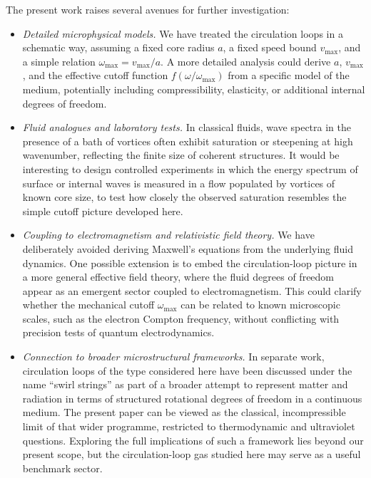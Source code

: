 \documentclass[11pt]{article}
\begin{document}
            The present work raises several avenues for further investigation:

            \begin{itemize}
                \item \emph{Detailed microphysical models.}
                We have treated the circulation loops in a schematic way, assuming a fixed
                core radius $a$, a fixed speed bound $v_{\max}$, and a simple relation
                $\omega_{\max} = v_{\max}/a$. A more detailed analysis could derive $a$,
                $v_{\max}$, and the effective cutoff function $f(\omega/\omega_{\max})$
                from a specific model of the medium, potentially including compressibility,
                elasticity, or additional internal degrees of freedom.

                \item \emph{Fluid analogues and laboratory tests.}
                In classical fluids, wave spectra in the presence of a bath of vortices often
                exhibit saturation or steepening at high wavenumber, reflecting the finite
                size of coherent structures. It would be interesting to design controlled
                experiments in which the energy spectrum of surface or internal waves is
                measured in a flow populated by vortices of known core size, to test how
                closely the observed saturation resembles the simple cutoff picture developed
                here.

                \item \emph{Coupling to electromagnetism and relativistic field theory.}
                We have deliberately avoided deriving Maxwell's equations from the underlying
                fluid dynamics. One possible extension is to embed the circulation-loop
                picture in a more general effective field theory, where the fluid degrees of
                freedom appear as an emergent sector coupled to electromagnetism. This could
                clarify whether the mechanical cutoff $\omega_{\max}$ can be related to
                known microscopic scales, such as the electron Compton frequency, without
                conflicting with precision tests of quantum electrodynamics.

                \item \emph{Connection to broader microstructural frameworks.}
                In separate work, circulation loops of the type considered here have been
                discussed under the name ``swirl strings'' as part of a broader attempt to
                represent matter and radiation in terms of structured rotational degrees of
                freedom in a continuous medium. The present paper can be viewed as the
                classical, incompressible limit of that wider programme, restricted to
                thermodynamic and ultraviolet questions. Exploring the full implications of
                such a framework lies beyond our present scope, but the circulation-loop
                gas studied here may serve as a useful benchmark sector.
            \end{itemize}
\end{document}
